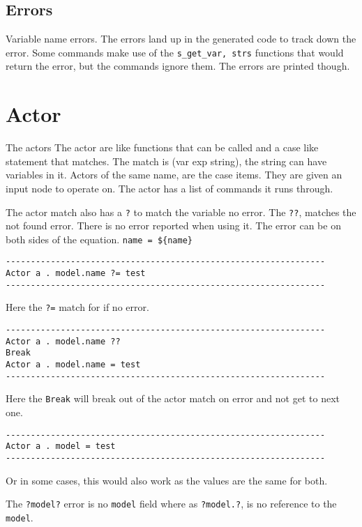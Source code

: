 \documentclass[11pt]{article}
\begin{document}
\subsection{Errors}
Variable name errors.
The errors land up in the generated code to track down the error. Some
commands make use of the \texttt{s\_get\_var,\ strs} functions that
would return the error, but the commands ignore them. The errors are
printed though.

\section{Actor}
The actors
The actor are like functions that can be called and a case like
statement that matches. The match is (var exp string), the string can
have variables in it. Actors of the same name, are the case items. They
are given an input node to operate on. The actor has a list of commands
it runs through.

The actor match also has a \texttt{?} to match the variable no error.
The \texttt{??}, matches the not found error. There is no error reported
when using it. The error can be on both sides of the equation.
\texttt{name\ =\ \$\{name\}}

\begin{verbatim}
----------------------------------------------------------------
Actor a . model.name ?= test
----------------------------------------------------------------
\end{verbatim}

Here the \texttt{?=} match for if no error.

\begin{verbatim}
----------------------------------------------------------------
Actor a . model.name ??
Break
Actor a . model.name = test
----------------------------------------------------------------
\end{verbatim}

Here the \texttt{Break} will break out of the actor match on error and
not get to next one.

\begin{verbatim}
----------------------------------------------------------------
Actor a . model = test
----------------------------------------------------------------
\end{verbatim}

Or in some cases, this would also work as the values are the same for
both.

The \texttt{?model?} error is no \texttt{model} field where as
\texttt{?model.?}, is no reference to the \texttt{model}.
\end{document}
